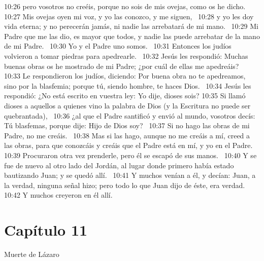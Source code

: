 10:26 pero vosotros no creéis, porque no sois de mis ovejas, como os he dicho.  
10:27 Mis ovejas oyen mi voz, y yo las conozco, y me siguen,  
10:28 y yo les doy vida eterna; y no perecerán jamás, ni nadie las arrebatará de mi mano.  
10:29 Mi Padre que me las dio, es mayor que todos, y nadie las puede arrebatar de la mano de mi Padre.  
10:30 Yo y el Padre uno somos.  
10:31 Entonces los judíos volvieron a tomar piedras para apedrearle.  
10:32 Jesús les respondió: Muchas buenas obras os he mostrado de mi Padre; ¿por cuál de ellas me apedreáis?  
10:33 Le respondieron los judíos, diciendo: Por buena obra no te apedreamos, sino por la blasfemia; porque tú, siendo hombre, te haces Dios.  
10:34 Jesús les respondió: ¿No está escrito en vuestra ley: Yo dije, dioses sois? 
10:35 Si llamó dioses a aquellos a quienes vino la palabra de Dios (y la Escritura no puede ser quebrantada),  
10:36 ¿al que el Padre santificó y envió al mundo, vosotros decís: Tú blasfemas, porque dije: Hijo de Dios soy?  
10:37 Si no hago las obras de mi Padre, no me creáis.  
10:38 Mas si las hago, aunque no me creáis a mí, creed a las obras, para que conozcáis y creáis que el Padre está en mí, y yo en el Padre. 
10:39 Procuraron otra vez prenderle, pero él se escapó de sus manos.  
10:40 Y se fue de nuevo al otro lado del Jordán, al lugar donde primero había estado bautizando Juan; y se quedó allí.  
10:41 Y muchos venían a él, y decían: Juan, a la verdad, ninguna señal hizo; pero todo lo que Juan dijo de éste, era verdad.  
10:42 Y muchos creyeron en él allí.  
\section*{Capítulo 11}
Muerte de Lázaro 

